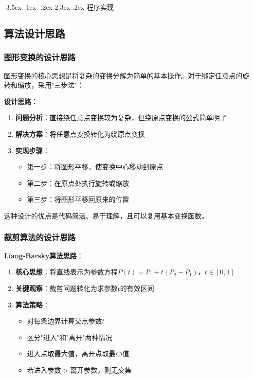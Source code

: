 \documentclass[12pt,a4paper]{article}
\makeatletter
\renewcommand\section{\@startsection{section}{1}{\z@}%
    {-3.5ex \@plus -1ex \@minus -.2ex}%
    {2.3ex \@plus.2ex}%
    {\normalfont\Large\bfseries\songti}}
\makeatother
\begin{document}
\clearpage

\section{程序实现}

\begin{tcolorbox}
\subsection{算法设计思路}

\subsubsection{图形变换的设计思路}

图形变换的核心思想是将复杂的变换分解为简单的基本操作。对于绑定任意点的旋转和缩放，采用"三步法"：

\textbf{设计思路}：
\begin{enumerate}
    \item \textbf{问题分析}：直接绕任意点变换较为复杂，但绕原点变换的公式简单明了
    \item \textbf{解决方案}：将任意点变换转化为绕原点变换
    \item \textbf{实现步骤}：
    \begin{itemize}
        \item 第一步：将图形平移，使变换中心移动到原点
        \item 第二步：在原点处执行旋转或缩放
        \item 第三步：将图形平移回原来的位置
    \end{itemize}
\end{enumerate}

这种设计的优点是代码简洁、易于理解，且可以复用基本变换函数。

\subsubsection{裁剪算法的设计思路}

\textbf{Liang-Barsky算法思路}：
\begin{enumerate}
    \item \textbf{核心思想}：将直线表示为参数方程$P(t) = P_1 + t(P_2-P_1)$，$t\in[0,1]$
    \item \textbf{关键观察}：裁剪问题转化为求参数$t$的有效区间
    \item \textbf{算法策略}：
    \begin{itemize}
        \item 对每条边界计算交点参数$t$
        \item 区分"进入"和"离开"两种情况
        \item 进入点取最大值，离开点取最小值
        \item 若进入参数$>$离开参数，则无交集
    \end{itemize}
\end{enumerate}


\end{tcolorbox}
\end{document}
